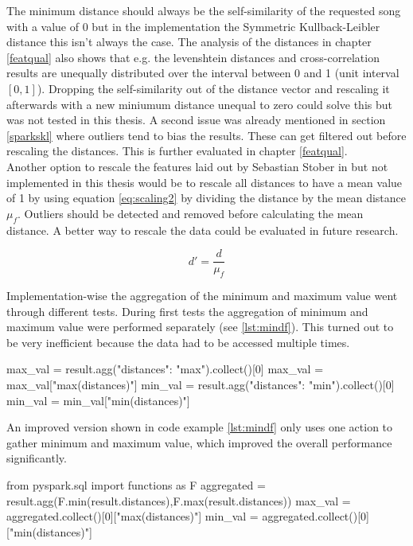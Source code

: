 \noindent The minimum distance should always be the self-similarity of the requested song with a value of 0 but in the implementation the Symmetric Kullback-Leibler distance this isn't always the case. The analysis of the distances in chapter \ref{featqual} also shows that e.g. the levenshtein distances and cross-correlation results are unequally distributed over the interval between 0 and 1 (unit interval $[0,1]$). Dropping the self-similarity out of the distance vector and rescaling it afterwards with a new miniumum distance unequal to zero could solve this but was not tested in this thesis. A second issue was already mentioned in section \ref{sparkskl} where outliers tend to bias the results. These can get filtered out before rescaling the distances. This is further evaluated in chapter \ref{featqual}.\\
Another option to rescale the features laid out by Sebastian Stober in \cite[pp. 543ff]{musicdata} but not implemented in this thesis would be to rescale all distances to have a mean value of 1 by using equation \ref{eq:scaling2} by dividing the distance by the mean distance $\mu_f$. Outliers should be detected and removed before calculating the mean distance. 
A better way to rescale the data could be evaluated in future research. 

\begin{equation} \label{eq:scaling2}
d' = \frac{d}{\mu_f}
\end{equation} 

\noindent Implementation-wise the aggregation of the minimum and maximum value went through different tests. During first tests the aggregation of minimum and maximum value were performed separately (see \ref{lst:mindf}). This turned out to be very inefficient because the data had to be accessed multiple times. 

\begin{pythonCode}[frame=single,label={lst:mindf},caption={Minimum and maximum aggregation separate},captionpos=b]
max_val = result.agg({"distances": "max"}).collect()[0]
max_val = max_val["max(distances)"]
min_val = result.agg({"distances": "min"}).collect()[0]
min_val = min_val["min(distances)"]
\end{pythonCode}

An improved version shown in code example \ref{lst:mindf} only uses one action to gather minimum and maximum value, which improved the overall performance significantly. 

\begin{pythonCode}[frame=single,label={lst:mindf},caption={Minimum and maximum aggregation optimized},captionpos=b]
from pyspark.sql import functions as F
aggregated = result.agg(F.min(result.distances),F.max(result.distances))
max_val = aggregated.collect()[0]["max(distances)"]
min_val = aggregated.collect()[0]["min(distances)"]
\end{pythonCode}

